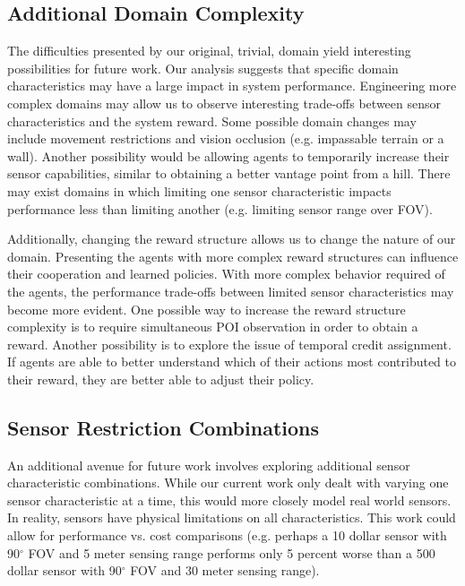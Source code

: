 \documentclass[letterpaper, 10 pt, conference]{ieeeconf}  %
\begin{document}
\subsection{Additional Domain Complexity}
The difficulties presented by our original, trivial, domain yield interesting possibilities for future work. Our analysis suggests that specific domain characteristics may have a large impact in system performance. Engineering more complex domains may allow us to observe interesting trade-offs between sensor characteristics and the system reward. Some possible domain changes may include movement restrictions and vision occlusion (e.g. impassable terrain or a wall). Another possibility would be allowing agents to temporarily increase their sensor capabilities, similar to obtaining a better vantage point from a hill. There may exist domains in which limiting one sensor characteristic impacts performance less than limiting another (e.g. limiting sensor range over FOV).

Additionally, changing the reward structure allows us to change the nature of our domain. Presenting the agents with more complex reward structures can influence their cooperation and learned policies. With more complex behavior required of the agents, the performance trade-offs between limited sensor characteristics may become more evident. One possible way to increase the reward structure complexity is to require simultaneous POI observation in order to obtain a reward. Another possibility is to explore the issue of temporal credit assignment. If agents are able to better understand which of their actions most contributed to their reward, they are better able to adjust their policy.

\subsection{Sensor Restriction Combinations}
An additional avenue for future work involves exploring additional sensor characteristic combinations. While our current work only dealt with varying one sensor characteristic at a time, this would more closely model real world sensors. In reality, sensors have physical limitations on all characteristics. This work could allow for performance vs. cost comparisons (e.g. perhaps a 10 dollar sensor with 90$^{\circ}$ FOV and 5 meter sensing range performs only 5 percent worse than a 500 dollar sensor with 90$^{\circ}$ FOV and 30 meter sensing range).
\end{document}
